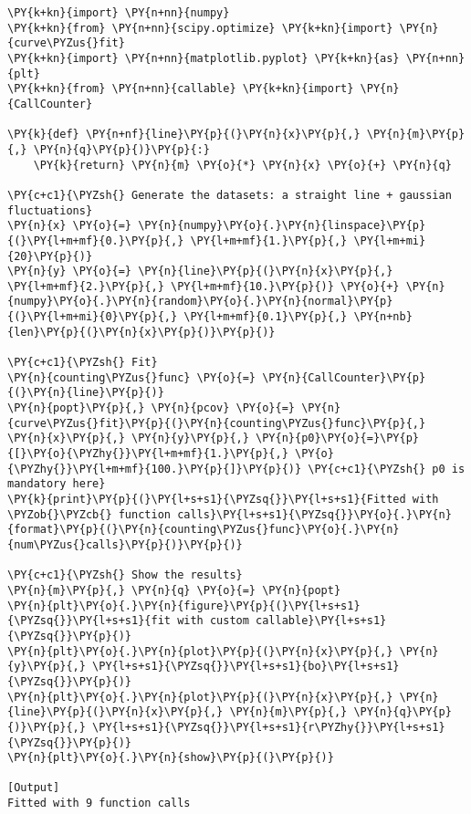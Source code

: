 \begin{Verbatim}[label=\makebox{\url{https://github.com/lucabaldini/cmepda/tree/master/slides/latex/snippets/test\_callable.py}},commandchars=\\\{\}]
\PY{k+kn}{import} \PY{n+nn}{numpy}
\PY{k+kn}{from} \PY{n+nn}{scipy.optimize} \PY{k+kn}{import} \PY{n}{curve\PYZus{}fit}
\PY{k+kn}{import} \PY{n+nn}{matplotlib.pyplot} \PY{k+kn}{as} \PY{n+nn}{plt}
\PY{k+kn}{from} \PY{n+nn}{callable} \PY{k+kn}{import} \PY{n}{CallCounter}

\PY{k}{def} \PY{n+nf}{line}\PY{p}{(}\PY{n}{x}\PY{p}{,} \PY{n}{m}\PY{p}{,} \PY{n}{q}\PY{p}{)}\PY{p}{:}
    \PY{k}{return} \PY{n}{m} \PY{o}{*} \PY{n}{x} \PY{o}{+} \PY{n}{q}

\PY{c+c1}{\PYZsh{} Generate the datasets: a straight line + gaussian fluctuations}
\PY{n}{x} \PY{o}{=} \PY{n}{numpy}\PY{o}{.}\PY{n}{linspace}\PY{p}{(}\PY{l+m+mf}{0.}\PY{p}{,} \PY{l+m+mf}{1.}\PY{p}{,} \PY{l+m+mi}{20}\PY{p}{)}
\PY{n}{y} \PY{o}{=} \PY{n}{line}\PY{p}{(}\PY{n}{x}\PY{p}{,} \PY{l+m+mf}{2.}\PY{p}{,} \PY{l+m+mf}{10.}\PY{p}{)} \PY{o}{+} \PY{n}{numpy}\PY{o}{.}\PY{n}{random}\PY{o}{.}\PY{n}{normal}\PY{p}{(}\PY{l+m+mi}{0}\PY{p}{,} \PY{l+m+mf}{0.1}\PY{p}{,} \PY{n+nb}{len}\PY{p}{(}\PY{n}{x}\PY{p}{)}\PY{p}{)}

\PY{c+c1}{\PYZsh{} Fit}
\PY{n}{counting\PYZus{}func} \PY{o}{=} \PY{n}{CallCounter}\PY{p}{(}\PY{n}{line}\PY{p}{)}
\PY{n}{popt}\PY{p}{,} \PY{n}{pcov} \PY{o}{=} \PY{n}{curve\PYZus{}fit}\PY{p}{(}\PY{n}{counting\PYZus{}func}\PY{p}{,} \PY{n}{x}\PY{p}{,} \PY{n}{y}\PY{p}{,} \PY{n}{p0}\PY{o}{=}\PY{p}{[}\PY{o}{\PYZhy{}}\PY{l+m+mf}{1.}\PY{p}{,} \PY{o}{\PYZhy{}}\PY{l+m+mf}{100.}\PY{p}{]}\PY{p}{)} \PY{c+c1}{\PYZsh{} p0 is mandatory here}
\PY{k}{print}\PY{p}{(}\PY{l+s+s1}{\PYZsq{}}\PY{l+s+s1}{Fitted with \PYZob{}\PYZcb{} function calls}\PY{l+s+s1}{\PYZsq{}}\PY{o}{.}\PY{n}{format}\PY{p}{(}\PY{n}{counting\PYZus{}func}\PY{o}{.}\PY{n}{num\PYZus{}calls}\PY{p}{)}\PY{p}{)}

\PY{c+c1}{\PYZsh{} Show the results}
\PY{n}{m}\PY{p}{,} \PY{n}{q} \PY{o}{=} \PY{n}{popt}
\PY{n}{plt}\PY{o}{.}\PY{n}{figure}\PY{p}{(}\PY{l+s+s1}{\PYZsq{}}\PY{l+s+s1}{fit with custom callable}\PY{l+s+s1}{\PYZsq{}}\PY{p}{)}
\PY{n}{plt}\PY{o}{.}\PY{n}{plot}\PY{p}{(}\PY{n}{x}\PY{p}{,} \PY{n}{y}\PY{p}{,} \PY{l+s+s1}{\PYZsq{}}\PY{l+s+s1}{bo}\PY{l+s+s1}{\PYZsq{}}\PY{p}{)}
\PY{n}{plt}\PY{o}{.}\PY{n}{plot}\PY{p}{(}\PY{n}{x}\PY{p}{,} \PY{n}{line}\PY{p}{(}\PY{n}{x}\PY{p}{,} \PY{n}{m}\PY{p}{,} \PY{n}{q}\PY{p}{)}\PY{p}{,} \PY{l+s+s1}{\PYZsq{}}\PY{l+s+s1}{r\PYZhy{}}\PY{l+s+s1}{\PYZsq{}}\PY{p}{)}
\PY{n}{plt}\PY{o}{.}\PY{n}{show}\PY{p}{(}\PY{p}{)}

[Output]
Fitted with 9 function calls
\end{Verbatim}